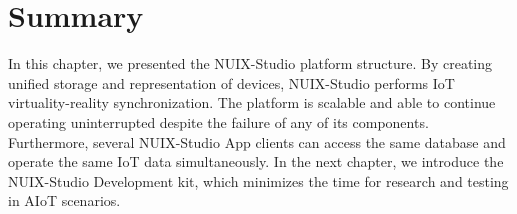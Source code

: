 \section{Summary}

In this chapter, we presented the NUIX-Studio platform structure. By creating unified storage and representation of devices, NUIX-Studio performs IoT virtuality-reality synchronization. The platform is scalable and able to continue operating uninterrupted despite the failure of any of its components. Furthermore, several NUIX-Studio App clients can access the same database and operate the same IoT data simultaneously. In the next chapter, we introduce the NUIX-Studio Development kit, which minimizes the time for research and testing in AIoT scenarios.